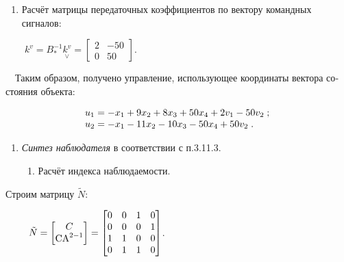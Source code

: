 \documentclass[a4paper]{article}
\newcounter{saveenum}
\newcommand\liststyleWWviiiNumlxvii{%
\renewcommand\theenumi{\arabic{enumi}}
\renewcommand\theenumii{\alph{enumii}}
\renewcommand\theenumiii{\roman{enumiii}}
\renewcommand\theenumiv{\arabic{enumiv}}
\renewcommand\labelenumi{\theenumi.}
\renewcommand\labelenumii{\theenumii.}
\renewcommand\labelenumiii{\theenumiii.}
\renewcommand\labelenumiv{\theenumiv.}
}
\newcommand\liststyleWWviiiNuml{%
\renewcommand\theenumi{\Roman{enumi}}
\renewcommand\theenumii{\arabic{enumii}}
\renewcommand\theenumiii{\roman{enumiii}}
\renewcommand\theenumiv{\arabic{enumiv}}
\renewcommand\labelenumi{\theenumi.}
\renewcommand\labelenumii{\theenumii.}
\renewcommand\labelenumiii{\theenumiii.}
\renewcommand\labelenumiv{\theenumiv.}
}
\newcommand\normalsubformula[1]{\text{\mathversion{normal}$#1$}}
\begin{document}
\liststyleWWviiiNumlxvii
\setcounter{saveenum}{\value{enumi}}
\begin{enumerate}
\setcounter{enumi}{\value{saveenum}}
\item {\begin{russian}\sffamily
Расчёт матрицы передаточных коэффициентов по вектору командных сигналов:
\end{russian}}
\end{enumerate}
{\begin{russian}\sffamily
\ \ \ \  $k^v=B_{\ast }^{-1}\underset{\vee }{k^v}=\left[\begin{matrix}2&-50\\0&50\end{matrix}\right]$.
\end{russian}}

{\begin{russian}\sffamily
\ \ Таким образом, получено управление, использующее координаты вектора состояния объекта:
\end{russian}}

\begin{equation*}
\begin{matrix}u_1=-x_1+9x_2+8x_3+50x_4+2v_1-50v_2\;;\hfill\null \\u_2=-x_1-11x_2-10x_3-50x_4+50v_2\;.\hfill\null
\end{matrix}\hfill 
\end{equation*}
\liststyleWWviiiNuml
\begin{enumerate}
\item {\begin{russian}\sffamily
\textit{Синтез наблюдателя }в соответствии с п.3.11.3.
\end{russian}}

\begin{enumerate}
\item {\begin{russian}\sffamily
Расчёт индекса наблюдаемости.
\end{russian}}
\end{enumerate}
\end{enumerate}
{\begin{russian}\sffamily
Строим матрицу  $\tilde  N$:
\end{russian}}

{\begin{russian}\sffamily
\ \ \textenglish{\ \ } $\tilde 
N=\left[\begin{matrix}C\\\normalsubformula{\text{CA}}^{2-1}\end{matrix}\right]=\left[\begin{matrix}0&0&1&0\\0&0&0&1\\1&1&0&0\\0&1&1&0\end{matrix}\right]$.
\end{russian}}
\end{document}
